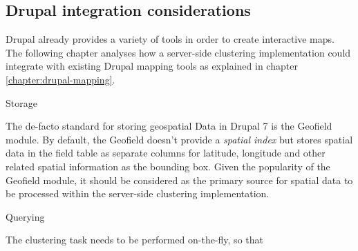 \subsection{Drupal integration considerations}
\label{chapter:analysis-drupal}

Drupal already provides a variety of tools in order to create interactive maps. The following chapter analyses how a server-side clustering implementation could integrate with existing Drupal mapping tools as explained in chapter \ref{chapter:drupal-mapping}.

Storage

The de-facto standard for storing geospatial Data in Drupal 7 is the Geofield module.  By default, the Geofield doesn't provide a \textit{spatial index} but stores spatial data in the field table as separate columns for latitude, longitude and other related spatial information as the bounding box. Given the popularity of the Geofield module, it should be considered as the primary source for spatial data to be processed within the server-side clustering implementation.

Querying


The clustering task needs to be performed on-the-fly, so that 





